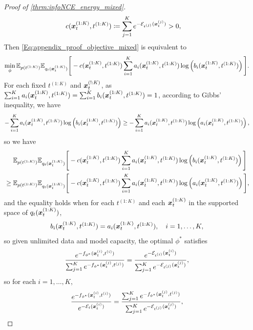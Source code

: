 \begin{proof}[Proof of \cref{thrm:infoNCE_energy_mixed}]
\begin{equation*}
\begin{split}
    c({\bm{x}}_t^{(1:K)}, t^{(1:K)}) &\coloneqq \sum_{j=1}^K e^{-{\mathcal{E}}_{t^{(j)}}({\bm{x}}_t^{(j)})} > 0,
\end{split}
\end{equation*}
Then \eqref{Eq:appendix_proof_objective_mixed} is equivalent to
\begin{equation*}
    \min_\phi \mathbb{E}_{p(t^{(1:K)})}\mathbb{E}_{q_t({\bm{x}}_t^{(1:K)})}\Bigg[
    -c({\bm{x}}_t^{(1:K)}, t^{(1:K)}) \sum_{i=1}^K
    a_i({\bm{x}}_t^{(1:K)},t^{(1:K)})
    \log \left(b_i({\bm{x}}_t^{(1:K)}, t^{(1:K)})\right)
\Bigg].
\end{equation*}
For each fixed $t^{(1:K)}$ and ${\bm{x}}_t^{(!:K)}$, as $\sum_{i=1}^K a_i({\bm{x}}_t^{(1:K)},t^{(1:K)}) = \sum_{i=1}^K b_i({\bm{x}}_t^{(1:K)},t^{(1:K)}) = 1$, according to Gibbs' inequality, we have
\begin{equation*}
    -\sum_{i=1}^K a_i({\bm{x}}_t^{(1:K)},t^{(1:K)}) \log \left(b_i({\bm{x}}_t^{(1:K)}, t^{(1:K)})\right)
    \geq -\sum_{i=1}^K a_i({\bm{x}}_t^{(1:K)},t^{(1:K)}) \log \left(a_i({\bm{x}}_t^{(1:K)}, t^{(1:K)})\right),
\end{equation*}
so we have
\begin{equation*}
\begin{split}
&\phantom{{}={}}\E_{p(t^{(1:K)})}\E_{q_t(\x_t^{(1:K)})}\Bigg[
    -c(\x_t^{(1:K)}, t^{(1:K)}) \sum_{i=1}^K
    a_i(\x_t^{(1:K)},t^{(1:K)})
    \log \left(b_i(\x_t^{(1:K)}, t^{(1:K)})\right)
\Bigg] \\
&\geq 
\E_{p(t^{(1:K)})}\E_{q_t(\x_t^{(1:K)})}\Bigg[
    -c(\x_t^{(1:K)}, t^{(1:K)}) \sum_{i=1}^K
    a_i(\x_t^{(1:K)},t^{(1:K)})
    \log \left(a_i(\x_t^{(1:K)}, t^{(1:K)})\right)
\Bigg],
\end{split}
\end{equation*}
and the equality holds when for each $t^{(1:K)}$ and each ${\bm{x}}_t^{(1:K)}$ in the supported space of $q_t({\bm{x}}_t^{(1:K)})$,
\begin{equation*}
    b_i({\bm{x}}_t^{(1:K)}, t^{(1:K)}) = a_i({\bm{x}}_t^{(1:K)}, t^{(1:K)}), \quad i=1,\dots,K,
\end{equation*}
so given unlimited data and model capacity, the optimal $\phi^*$ satisfies
\begin{equation*}
    \frac{e^{-f_{\phi^*}({\bm{x}}_t^{(i)},t^{(i)})}}{\sum_{j=1}^K e^{-f_{\phi^*}({\bm{x}}_t^{(j)},t^{(j)})}} = \frac{e^{-{\mathcal{E}}_{t^{(i)}}({\bm{x}}_t^{(i)})}}{\sum_{j=1}^K e^{-{\mathcal{E}}_{t^{(j)}}({\bm{x}}_t^{(j)})}},
\end{equation*}
so for each $i=1,\dots,K$,
\begin{equation*}
    \frac{e^{-f_{\phi^*}(\x_t^{(i)},t^{(i)})}}{e^{-\gE_t(\x_t^{(i)})}} = \frac{\sum_{j=1}^K e^{-f_{\phi^*}(\x_t^{(j)},t^{(j)})}}{\sum_{j=1}^K e^{-\gE_{t^{(j)}}(\x_t^{(j)})}},

\end{equation*}
\end{proof}

